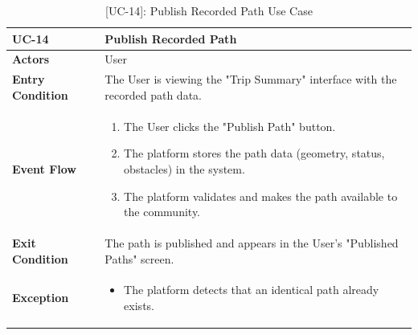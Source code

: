 \begin{table}[H]
    \centering
    \setlength\extrarowheight{2pt}
    \renewcommand{\arraystretch}{1.2}
    \begin{tabularx}{\textwidth}{|>{\bfseries}l|X|}
    \hline
    UC-14& Publish Recorded Path \\ \hline
    Actors & User\\ \hline
    Entry Condition & The User is viewing the "Trip Summary" interface with the recorded path data.\\ \hline
    Event Flow & 
    \begin{enumerate}
      \item The User clicks the "Publish Path" button.
      \item The platform stores the path data (geometry, status, obstacles) in the system.
      \item The platform validates and makes the path available to the community.
    \end{enumerate}
    \\ \hline
    Exit Condition &  The path is published and appears in the User’s "Published Paths" screen.\\ \hline
    Exception & 
    \begin{itemize}
        \item The platform detects that an identical path already exists.
    \end{itemize}
    \\ \hline
   \end{tabularx}
   \caption{[UC-14]: Publish Recorded Path Use Case}
    \label{UC-14}
\end{table}


\newpage
